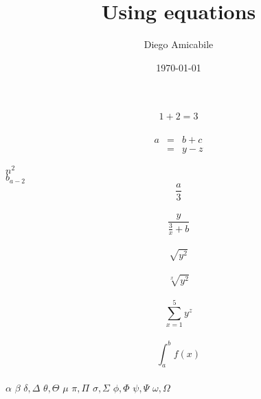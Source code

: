 \documentclass[a4paper,12pt]{article}
\begin{document}
\title{Using equations}
\author{Diego Amicabile}
\date{\today}
\maketitle

\begin{equation}
1+2=3
\end{equation}
\\

\begin{eqnarray}
a & = & b + c \\
& = & y - z
\end{eqnarray}


$n^2$
\\
$b_{a-2}$
\\
$$\frac{a}{3}$$
\\
$$\frac{y}{\frac{3}{x}+b}$$
\\
$$\sqrt{y^2}$$
\\
$$\sqrt[x]{y^2}$$
\\
$$\sum_{x=1}^5 y^z$$
\\
$$\int_a^b f(x)$$
\\

$\alpha$
$\beta$
$\delta, \Delta$
$\theta, \Theta$
$\mu$
$\pi, \Pi$
$\sigma, \Sigma$
$\phi, \Phi$
$\psi, \Psi$
$\omega, \Omega$
\end{document}
